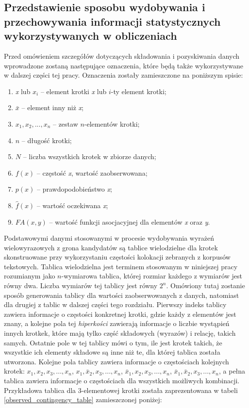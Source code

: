\documentclass[11pt,a4paper]{llncs}
\begin{document}
\subsection{Przedstawienie sposobu wydobywania i przechowywania informacji statystycznych wykorzystywanych w obliczeniach}
Przed omówieniem szczegółów dotyczących składowania i pozyskiwania danych wprowadzone zostaną następujące oznaczenia, które będą także wykorzystywane w dalszej części tej pracy.
Oznaczenia zostały zamieszczone na poniższym spisie:

\begin{enumerate}
	\item \emph{x} lub \( {x_{i}} \) -- element krotki \emph{x} lub $i$-ty element krotki;
	\item \( \bar{x} \) -- element inny niż \emph{x};
	\item $ x_{1}, x_{2}, ..., x_{n} $ -- zestaw $n$-elementów krotki;
	\item $n$ -- długość krotki;
	\item \( N \) -- liczba wszystkich krotek w zbiorze danych;
	\item \( f(x) \) -- częstość \emph{x}, wartość zaobserwowana;
	\item \( p(x) \) -- prawdopodobieństwo \emph{x};
	\item \( \hat{f}(x) \) -- wartość oczekiwana \emph{x};
	\item \( FA(x, y) \) -- wartość funkcji asocjacyjnej dla elementów \emph{x} oraz \emph{y}.
\end{enumerate}

Podstawowymi danymi stosowanymi w procesie wydobywania wyrażeń wielowyrazowych z grona kandydatów są tablice wielodzielne dla krotek skonstruowane przy wykorzystaniu częstości kolokacji zebranych z korpusów tekstowych.
Tablica wielodzielna jest terminem stosowanym w niniejszej pracy rozumianym jako $n$-wymiarowa tablica, której rozmiar każdego z wymiarów jest równy dwa.
Liczba wymiarów tej tablicy jest równy $ 2^{n} $.
Omówiony tutaj zostanie sposób generowania tablicy dla wartości zaobserwowanych z danych, natomiast dla drugiej z tablic w dalszej części tego rozdziału.
Pierwszy indeks tablicy zawiera informacje o częstości konkretnej krotki, gdzie każdy z elementów jest znany, a kolejne pola tej  \emph{hiperkości} zawierają informacje o liczbie wystąpień innych krotkek, które mają tylko część składowych (wyrazów) i relację, takich samych.
Ostatnie pole w tej tablicy mówi o tym, ile jest krotek takich, że wszystkie ich elementy składowe są inne niż te, dla której tablica została utworzona.
Kolejne pola tablicy zawiera informacje o częstościach kolejnych krotek: $ x_{1}, x_{2}, x_{3}, ..., x_{n} $, $ x_{1}, \bar{x}_{2}, x_{3}, ..., x_{n} $, $ \bar{x}_{1}, x_{2}, x_{3}, ..., x_{n} $, $ \bar{x}_{1}, \bar{x}_{2}, x_{3}, ..., x_{n} $, a pełna tablica zawiera informacje o częstościach dla wszystkich możliwych kombinacji.
Przykładowa tablica dla 3-elementowej krotki została zaprezentowana w tabeli \ref{observed_contingency_table} zamieszczonej poniżej:
\end{document}
